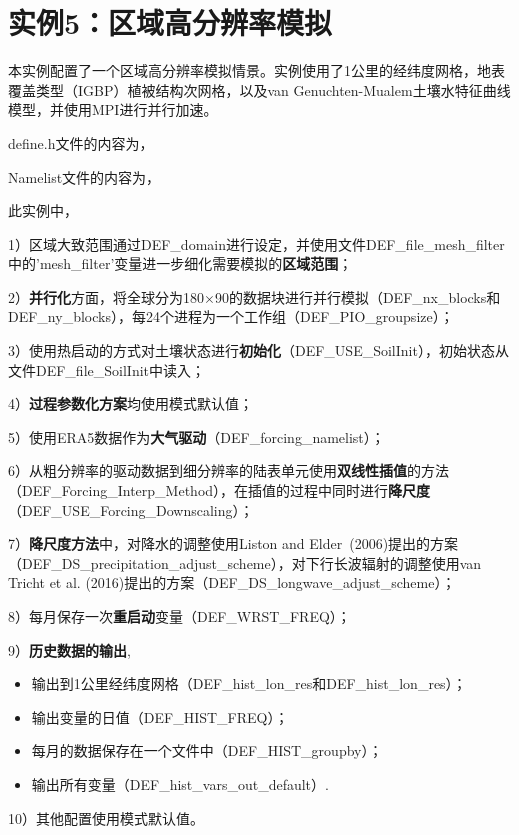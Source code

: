 \documentclass[a4paper,12pt,twoside]{article}
\begin{document}
\section{实例5：区域高分辨率模拟}

本实例配置了一个区域高分辨率模拟情景。实例使用了1公里的经纬度网格，地表覆盖类型（IGBP）植被结构次网格，以及van Genuchten-Mualem土壤水特征曲线模型，并使用MPI进行并行加速。

define.h文件的内容为，


Namelist文件的内容为，


此实例中，\par
1）区域大致范围通过DEF\_domain进行设定，并使用文件DEF\_file\_mesh\_filter中的'mesh\_filter'变量进一步细化需要模拟的\textbf{区域范围}；\par
2）\textbf{并行化}方面，将全球分为180\textdegree$\times$90\textdegree 的数据块进行并行模拟（DEF\_nx\_blocks和DEF\_ny\_blocks），每24个进程为一个工作组（DEF\_PIO\_groupsize）；\par
3）使用热启动的方式对土壤状态进行\textbf{初始化}（DEF\_USE\_SoilInit），初始状态从文件DEF\_file\_SoilInit中读入；\par
4）\textbf{过程参数化方案}均使用模式默认值；\par
5）使用ERA5数据作为\textbf{大气驱动}（DEF\_forcing\_namelist）；\par
6）从粗分辨率的驱动数据到细分辨率的陆表单元使用\textbf{双线性插值}的方法\\ （DEF\_Forcing\_Interp\_Method），在插值的过程中同时进行\textbf{降尺度}\\ （DEF\_USE\_Forcing\_Downscaling）；\par
7）\textbf{降尺度方法}中，对降水的调整使用Liston and Elder~(2006)提出的方案\\ （DEF\_DS\_precipitation\_adjust\_scheme），对下行长波辐射的调整使用van Tricht et al. (2016)提出的方案（DEF\_DS\_longwave\_adjust\_scheme）；\par
8）每月保存一次\textbf{重启动}变量（DEF\_WRST\_FREQ）；\par
9）\textbf{历史数据的输出},
\begin{itemize}[nosep,leftmargin=4em]
    \item 输出到1公里经纬度网格（DEF\_hist\_lon\_res和DEF\_hist\_lon\_res）；
    \item 输出变量的日值（DEF\_HIST\_FREQ）；
    \item 每月的数据保存在一个文件中（DEF\_HIST\_groupby）；
    \item 输出所有变量（DEF\_hist\_vars\_out\_default）.
\end{itemize}\par
10）其他配置使用模式默认值。
\end{document}
